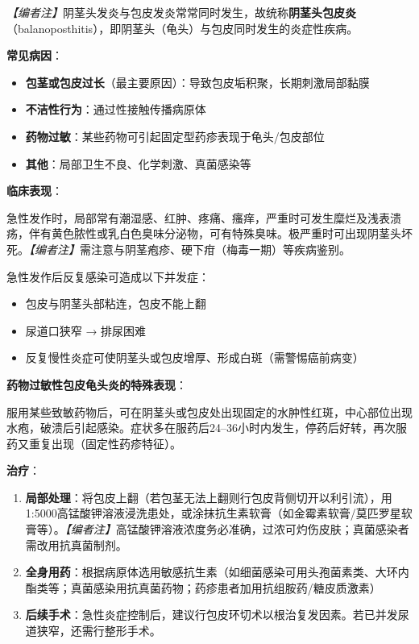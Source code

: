 \noindent\textit{【编者注】}阴茎头发炎与包皮发炎常常同时发生，故统称\textbf{阴茎头包皮炎}（balanoposthitis），即阴茎头（龟头）与包皮同时发生的炎症性疾病。

\vspace{0.5em}
\noindent\textbf{常见病因}：

\begin{itemize}
	\item \textbf{包茎或包皮过长}（最主要原因）：导致包皮垢积聚，长期刺激局部黏膜
	\item \textbf{不洁性行为}：通过性接触传播病原体
	\item \textbf{药物过敏}：某些药物可引起固定型药疹表现于龟头/包皮部位
	\item \textbf{其他}：局部卫生不良、化学刺激、真菌感染等
\end{itemize}

\vspace{0.5em}
\noindent\textbf{临床表现}：

急性发作时，局部常有潮湿感、红肿、疼痛、瘙痒，严重时可发生糜烂及浅表溃疡，伴有黄色脓性或乳白色臭味分泌物，可有特殊臭味。极严重时可出现阴茎头坏死。\textit{【编者注】}需注意与阴茎疱疹、硬下疳（梅毒一期）等疾病鉴别。

急性发作后反复感染可造成以下并发症：
\begin{itemize}
	\item 包皮与阴茎头部粘连，包皮不能上翻
	\item 尿道口狭窄 → 排尿困难
	\item 反复慢性炎症可使阴茎头或包皮增厚、形成白斑（需警惕癌前病变）
\end{itemize}

\vspace{0.5em}
\noindent\textbf{药物过敏性包皮龟头炎的特殊表现}：

服用某些致敏药物后，可在阴茎头或包皮处出现固定的水肿性红斑，中心部位出现水疱，破溃后引起感染。症状多在服药后24--36小时内发生，停药后好转，再次服药又重复出现（固定性药疹特征）。

\vspace{0.5em}
\noindent\textbf{治疗}：
\begin{enumerate}
	\item \textbf{局部处理}：将包皮上翻（若包茎无法上翻则行包皮背侧切开以利引流），用1:5000高锰酸钾溶液浸洗患处，或涂抹抗生素软膏（如金霉素软膏/莫匹罗星软膏等）。\textit{【编者注】}高锰酸钾溶液浓度务必准确，过浓可灼伤皮肤；真菌感染者需改用抗真菌制剂。
	\item \textbf{全身用药}：根据病原体选用敏感抗生素（如细菌感染可用头孢菌素类、大环内酯类等；真菌感染用抗真菌药物；药疹患者加用抗组胺药/糖皮质激素）
	\item \textbf{后续手术}：急性炎症控制后，建议行包皮环切术以根治复发因素。若已并发尿道狭窄，还需行整形手术。
\end{enumerate}

